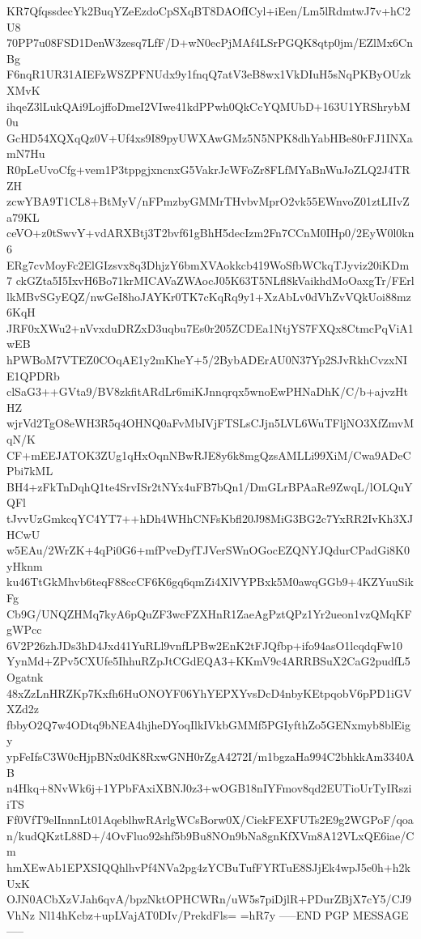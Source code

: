 KR7QfqssdecYk2BuqYZeEzdoCpSXqBT8DAOfICyl+iEen/Lm5lRdmtwJ7v+hC2U8
70PP7u08FSD1DenW3zesq7LfF/D+wN0ecPjMAf4LSrPGQK8qtp0jm/EZlMx6CnBg
F6nqR1UR31AIEFzWSZPFNUdx9y1fnqQ7atV3eB8wx1VkDIuH5sNqPKByOUzkXMvK
ihqeZ3lLukQAi9LojffoDmeI2VIwe41kdPPwh0QkCcYQMUbD+163U1YRShrybM0u
GcHD54XQXqQz0V+Uf4xs9I89pyUWXAwGMz5N5NPK8dhYabHBe80rFJ1INXamN7Hu
R0pLeUvoCfg+vem1P3tppgjxncnxG5VakrJcWFoZr8FLfMYaBnWuJoZLQ2J4TRZH
zcwYBA9T1CL8+BtMyV/nFPmzbyGMMrTHvbvMprO2vk55EWnvoZ01ztLIIvZa79KL
ceVO+z0tSwvY+vdARXBtj3T2bvf61gBhH5decIzm2Fn7CCnM0IHp0/2EyW0l0kn6
ERg7cvMoyFc2ElGIzsvx8q3DhjzY6bmXVAokkcb419WoSfbWCkqTJyviz20iKDm7
ckGZta5I5IxvH6Bo71krMICAVaZWAocJ05K63T5NLfl8kVaikhdMoOaxgTr/FErl
lkMBvSGyEQZ/nwGeI8hoJAYKr0TK7cKqRq9y1+XzAbLv0dVhZvVQkUoi88mz6KqH
JRF0xXWu2+nVvxduDRZxD3uqbu7Es0r205ZCDEa1NtjYS7FXQx8CtmcPqViA1wEB
hPWBoM7VTEZ0COqAE1y2mKheY+5/2BybADErAU0N37Yp2SJvRkhCvzxNIE1QPDRb
clSaG3++GVta9/BV8zkfitARdLr6miKJnnqrqx5wnoEwPHNaDhK/C/b+ajvzHtHZ
wjrVd2TgO8eWH3R5q4OHNQ0aFvMbIVjFTSLsCJjn5LVL6WuTFljNO3XfZmvMqN/K
CF+mEEJATOK3ZUg1qHxOqnNBwRJE8y6k8mgQzsAMLLi99XiM/Cwa9ADeCPbi7kML
BH4+zFkTnDqhQ1te4SrvISr2tNYx4uFB7bQn1/DmGLrBPAaRe9ZwqL/lOLQuYQFl
tJvvUzGmkcqYC4YT7++hDh4WHhCNFsKbfl20J98MiG3BG2c7YxRR2IvKh3XJHCwU
w5EAu/2WrZK+4qPi0G6+mfPveDyfTJVerSWnOGocEZQNYJQdurCPadGi8K0yHknm
ku46TtGkMhvb6teqF88ccCF6K6gq6qmZi4XlVYPBxk5M0awqGGb9+4KZYuuSikFg
Cb9G/UNQZHMq7kyA6pQuZF3wcFZXHnR1ZaeAgPztQPz1Yr2ueon1vzQMqKFgWPcc
6V2P26zhJDs3hD4Jxd41YuRLl9vnfLPBw2EnK2tFJQfbp+ifo94asO1lcqdqFw10
YynMd+ZPv5CXUfe5IhhuRZpJtCGdEQA3+KKmV9c4ARRBSuX2CaG2pudfL5Ogatnk
48xZzLnHRZKp7Kxfh6HuONOYF06YhYEPXYvsDcD4nbyKEtpqobV6pPD1iGVXZd2z
fbbyO2Q7w4ODtq9bNEA4hjheDYoqIlkIVkbGMMf5PGIyfthZo5GENxmyb8blEigy
ypFeIfsC3W0cHjpBNx0dK8RxwGNH0rZgA4272I/m1bgzaHa994C2bhkkAm3340AB
n4Hkq+8NvWk6j+1YPbFAxiXBNJ0z3+wOGB18nIYFmov8qd2EUTioUrTyIRsziiTS
Ff0VfT9elInnnLt01AqeblhwRArlgWCsBorw0X/CiekFEXFUTs2E9g2WGPoF/qoa
n/kudQKztL88D+/4OvFluo92shf5b9Bu8NOn9bNa8gnKfXVm8A12VLxQE6iae/Cm
hmXEwAb1EPXSIQQhlhvPf4NVa2pg4zYCBuTufFYRTuE8SJjEk4wpJ5e0h+h2kUxK
OJN0ACbXzVJah6qvA/bpzNktOPHCWRn/uW5s7piDjlR+PDurZBjX7cY5/CJ9VhNz
Nl14hKcbz+upLVajAT0DIv/PrekdFls=
=hR7y
-----END PGP MESSAGE-----
